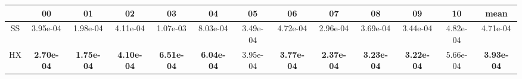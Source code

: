 \begin{tabular}{|c|c|c|c|c|c|c|c|c|c|c|c|c|}
\hline
 & 00 & 01 & 02 & 03 & 04 & 05 & 06 & 07 & 08 & 09 & 10 & mean \\
\hline
SS & 3.95e-04 & 1.98e-04 & 4.11e-04 & 1.07e-03 & 8.03e-04 & 3.49e-04 & 4.72e-04 & 2.96e-04 & 3.69e-04 & 3.44e-04 & 4.82e-04 & 4.71e-04 \\
\hline
HX & \textbf{2.70e-04} & \textbf{1.75e-04} & \textbf{4.10e-04} & \textbf{6.51e-04} & \textbf{6.04e-04} & 3.95e-04 & \textbf{3.77e-04} & \textbf{2.37e-04} & \textbf{3.23e-04} & \textbf{3.22e-04} & 5.66e-04 & \textbf{3.93e-04} \\
\hline
\end{tabular}
